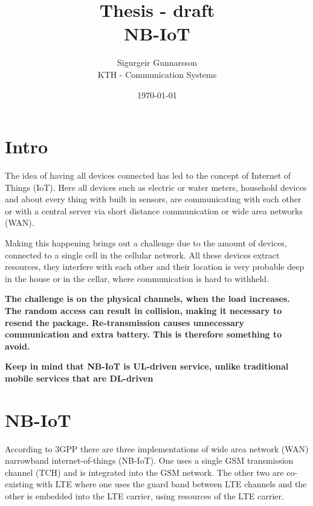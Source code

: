 \documentclass[10pt,a4paper,titlepage,twoside]{article}
\title{\blue Thesis - draft \\
\blueb NB-IoT}
\author{Sigurgeir Gunnarsson \\KTH - Communication Systems}
\date{\today}
\newcommand{\point}[1]{\textbf{\color{ymared} #1}}
\begin{document}
\maketitle


\thispagestyle{empty}
\tableofcontents

\newpage
\setcounter{page}{1}



\section{Intro}


The idea of having all devices connected has led to the concept of Internet of Things (IoT). Here all devices such as electric or water meters, household devices and about every thing with built in sensors, are communicating with each other or with a central server via short distance communication or wide area networks (WAN).

Making this happening brings out a challenge due to the amount of devices, connected to a single cell in the cellular network. All these devices extract resources, they interfere with each other and their location is very probable deep in the house or in the cellar, where communication is hard to withheld.

\point{The challenge is on the physical channels, when the load increases. The random access can result in collision, making it necessary to resend the package. Re-transmission causes unnecessary communication and extra battery. This is therefore something to avoid.}

\point{Keep in mind that NB-IoT is UL-driven service, unlike traditional mobile services that are DL-driven}

\clearpage
\section{NB-IoT}

According to 3GPP there are three implementations of wide area network (WAN) narrowband internet-of-things (NB-IoT). One uses a single GSM transmission channel (TCH) and is integrated into the GSM network. The other two are co-existing with LTE where one uses the guard band between LTE channels and the other is embedded into the LTE carrier, using resources of the LTE carrier.
\end{document}
